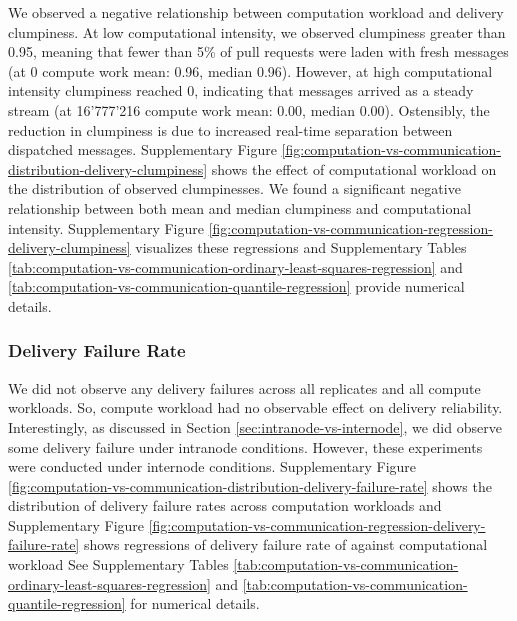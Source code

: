 We observed a negative relationship between computation workload and delivery clumpiness.
At low computational intensity, we observed clumpiness greater than 0.95, meaning that fewer than 5\% of pull requests were laden with fresh messages (at 0 compute work mean: 0.96, median 0.96).
However, at high computational intensity clumpiness reached 0, indicating that messages arrived as a steady stream (at 16'777'216 compute work mean: 0.00, median 0.00).
Ostensibly, the reduction in clumpiness is due to increased real-time separation between dispatched messages.
Supplementary Figure \ref{fig:computation-vs-communication-distribution-delivery-clumpiness} shows the effect of computational workload on the distribution of observed clumpinesses.
We found a significant negative relationship between both mean and median clumpiness and computational intensity.
Supplementary Figure \ref{fig:computation-vs-communication-regression-delivery-clumpiness} visualizes these regressions and Supplementary Tables \ref{tab:computation-vs-communication-ordinary-least-squares-regression} and \ref{tab:computation-vs-communication-quantile-regression} provide numerical details.

\subsubsection{Delivery Failure Rate}

We did not observe any delivery failures across all replicates and all compute workloads.
So, compute workload had no observable effect on delivery reliability.
Interestingly, as discussed in Section \ref{sec:intranode-vs-internode}, we did observe some delivery failure under intranode conditions.
However, these experiments were conducted under internode conditions.
Supplementary Figure \ref{fig:computation-vs-communication-distribution-delivery-failure-rate} shows the distribution of delivery failure rates across computation workloads and Supplementary Figure \ref{fig:computation-vs-communication-regression-delivery-failure-rate} shows regressions of delivery failure rate of against computational workload
See Supplementary Tables \ref{tab:computation-vs-communication-ordinary-least-squares-regression} and \ref{tab:computation-vs-communication-quantile-regression} for numerical details.

